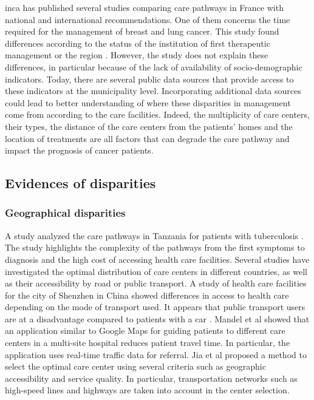 \ac{inca} has published several studies comparing care pathways in France with
national and international recommendations. One of them concerns the time
required for the management of breast and lung cancer. This study found
differences according to the status of the institution of first therapeutic
management or the region \cite{bernard_ledesert_etude_2012}. However, the study
does not explain these differences, in particular because of the lack of
availability of socio-demographic indicators. Today, there are several public
data sources that provide access to these indicators at the municipality level.
Incorporating additional data sources could lead to better understanding of
where these disparities in management come from according to the care
facilities. Indeed, the multiplicity of care centers, their types, the distance
of the care centers from the patients' homes and the location of treatments are
all factors that can degrade the care pathway and impact the prognosis of cancer
patients.

\subsection{Evidences of disparities}

\subsubsection{Geographical disparities}

A study analyzed the care pathways in Tanzania for patients with tuberculosis
\cite{mhalu_pathways_2019}. The study highlights the complexity of the pathways
from the first symptoms to diagnosis and the high cost of accessing health care
facilities. Several studies have investigated the optimal distribution of care
centers in different countries, as well as their accessibility by road or public
transport. A study of health care facilities for the city of Shenzhen in China
showed differences in access to health care depending on the mode of transport
used. It appears that public transport users are at a disadvantage compared to
patients with a car \cite{tao_spatial_2018}. Mandel et al
\cite{mandel_optimizing_2018} showed that an application similar to Google Maps
for guiding patients to different care centers in a multi-site hospital reduces
patient travel time. In particular, the application uses real-time traffic data
for referral. Jia et al \cite{jia_selecting_2014} proposed a method to select
the optimal care center using several criteria such as geographic accessibility
and service quality. In particular, transportation networks such as high-speed
lines and highways are taken into account in the center selection.

